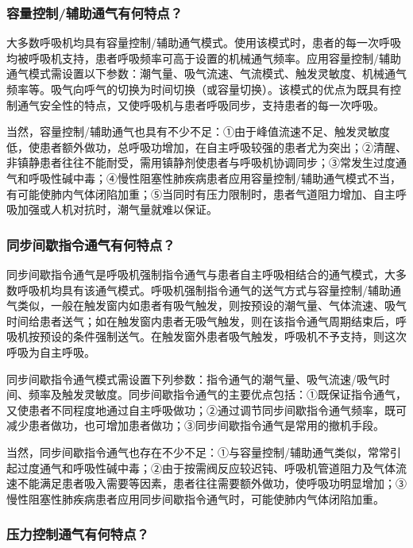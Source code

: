 \subsubsection{容量控制/辅助通气有何特点？}

大多数呼吸机均具有容量控制/辅助通气模式。使用该模式时，患者的每一次呼吸均被呼吸机支持，患者呼吸频率可高于设置的机械通气频率。应用容量控制/辅助通气模式需设置以下参数：潮气量、吸气流速、气流模式、触发灵敏度、机械通气频率等。吸气向呼气的切换为时间切换（或容量切换）。该模式的优点为既具有控制通气安全性的特点，又使呼吸机与患者呼吸同步，支持患者的每一次呼吸。

当然，容量控制/辅助通气也具有不少不足：①由于峰值流速不足、触发灵敏度低，使患者额外做功，总呼吸功增加，在自主呼吸较强的患者尤为突出；②清醒、非镇静患者往往不能耐受，需用镇静剂使患者与呼吸机协调同步；③常发生过度通气和呼吸性碱中毒；④慢性阻塞性肺疾病患者应用容量控制/辅助通气模式不当，有可能使肺内气体闭陷加重；⑤当同时有压力限制时，患者气道阻力增加、自主呼吸加强或人机对抗时，潮气量就难以保证。

\subsubsection{同步间歇指令通气有何特点？}

同步间歇指令通气是呼吸机强制指令通气与患者自主呼吸相结合的通气模式，大多数呼吸机均具有该通气模式。呼吸机强制指令通气的送气方式与容量控制/辅助通气类似，一般在触发窗内如患者有吸气触发，则按预设的潮气量、气体流速、吸气时间给患者送气；如在触发窗内患者无吸气触发，则在该指令通气周期结束后，呼吸机按预设的条件强制送气。在触发窗外患者吸气触发，呼吸机不予支持，则这次呼吸为自主呼吸。

同步间歇指令通气模式需设置下列参数：指令通气的潮气量、吸气流速/吸气时间、频率及触发灵敏度。同步间歇指令通气的主要优点包括：①既保证指令通气，又使患者不同程度地通过自主呼吸做功；②通过调节同步间歇指令通气频率，既可减少患者做功，也可增加患者做功；③同步间歇指令通气是常用的撤机手段。

当然，同步间歇指令通气也存在不少不足：①与容量控制/辅助通气类似，常常引起过度通气和呼吸性碱中毒；②由于按需阀反应较迟钝、呼吸机管道阻力及气体流速不能满足患者吸入需要等因素，患者往往需要额外做功，使呼吸功明显增加；③慢性阻塞性肺疾病患者应用同步间歇指令通气时，可能使肺内气体闭陷加重。

\subsubsection{压力控制通气有何特点？}


